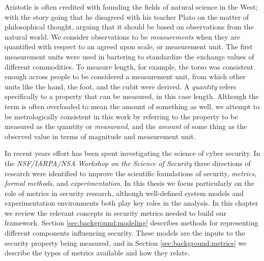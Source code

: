 
Aristotle is often credited with founding the fields of natural science in the West; with the story going that he disagreed with his teacher Plato on the matter of philosophical thought, arguing that it should be based on observations from the natural world. We consider observations to be  \textit{measurements} when they are quantified with respect to an agreed upon scale, or measurement unit. The first measurement units were used in bartering to standardize the exchange values of different commodities\cite{Morris_2001}. To measure length, for example, the torso was consistent enough across people to be considered a measurement unit, from which other units like the hand, the foot, and the cubit were derived. A \textit{quantity} refers specifically to a property that can be measured, in this case length. Although the term is often\cite{Debievre_2009} overloaded to mean the amount of something as well, we attempt to be metrologically consistent in this work by referring to the property to be measured as the quantity or \textit{measurand}, and the \textit{amount} of some thing as the observed value in terms of magnitude and measurement unit. 

In recent years effort has been spent investigating the science of cyber security\cite{Kott_2014, Schneider, Chang_2019, Spring_Moore_Pym_2017}. In the \textit{NSF/IARPA/NSA Workshop on the Science of Security}\cite{Evans_2008} three directions of research were identified to improve the scientific foundations of security, \textit{metrics}, \textit{formal methods}, and \textit{experimentation}. In this thesis we focus particularly on the role of metrics in security research, although well-defined system models and experimentation environments both play key roles in the analysis. In this chapter we review the relevant concepts in security metrics needed to build our framework. Section \ref{sec:background:modeling} describes methods for representing different components influencing security. These models are the inputs to the security property being measured, and in Section \ref{sec:background:metrics} we describe the types of metrics available and how they relate. %